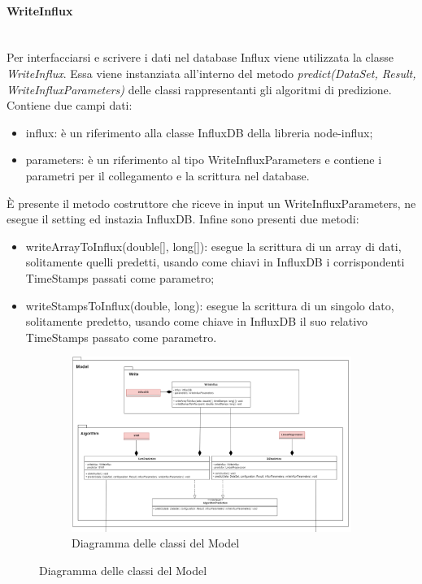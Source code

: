 \paragraph*{WriteInflux} \mbox{}\\ [1mm]
Per interfacciarsi e scrivere i dati nel database Influx viene utilizzata la classe \textit{WriteInflux}. Essa viene instanziata all'interno del metodo \textit{predict(DataSet, Result, WriteInfluxParameters)} delle classi rappresentanti gli algoritmi di predizione. Contiene due campi dati:
\begin{itemize}
	\item influx: è un riferimento alla classe InfluxDB della libreria node-influx;
	\item parameters: è un riferimento al tipo WriteInfluxParameters e contiene i parametri per il collegamento e la scrittura nel database.
\end{itemize}
È presente il metodo costruttore che riceve in input un WriteInfluxParameters, ne esegue il setting ed instazia InfluxDB.
Infine sono presenti due metodi:
\begin{itemize}
	\item writeArrayToInflux(double[], long[]): esegue la scrittura di un array di dati, solitamente quelli predetti, usando come chiavi in InfluxDB i corrispondenti TimeStamps passati come parametro;
	\item writeStampsToInflux(double, long): esegue la scrittura di un singolo dato, solitamente predetto, usando come chiave in InfluxDB il suo relativo TimeStamps passato come parametro.
\end{itemize}
\mbox{}
\begin{landscape}
	\begin{figure}
		\begin{figure} [H]
			\includegraphics[width=\linewidth]{./img/Diagrammi/model-plug-in.png}
			\caption{Diagramma delle classi del Model}
		\end{figure}
	\end{figure}
\end{landscape}

